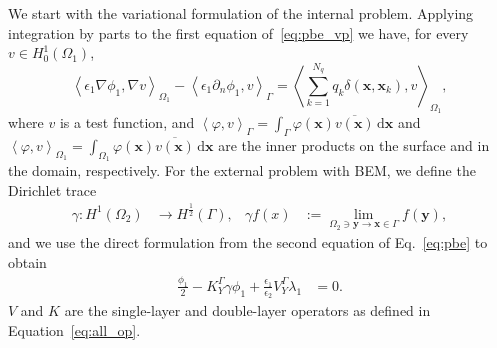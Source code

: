 We start with the variational formulation of the internal problem. Applying integration by parts to the first equation of~\eqref{eq:pbe_vp} we have, for every $v \in H_0^1(\Omega_1)$,
% 
\begin{equation}
\label{eq:fem}
 \left\langle \epsilon_1 \nabla \phi_1, \nabla v \right\rangle_{\Omega_1}  -  \left\langle  \epsilon_1\partial_n \phi_1, v \right\rangle_\Gamma =  \left\langle \sum_{k=1}^{N_q} q_k\delta(\mathbf{x},\mathbf{x}_k),  v\right\rangle_{\Omega_1},
\end{equation}
%
where $v$ is a test function, and $\left\langle\varphi,v\right\rangle_\Gamma = \int_\Gamma \varphi(\mathbf{x})\overline{v(\mathbf{x})}\,\mathrm{d}\mathbf{x}$ and $\left\langle\varphi,v\right\rangle_{\Omega_1} = \int_{\Omega_1} \varphi(\mathbf{x})\overline{v(\mathbf{x})}\,\mathrm{d}\mathbf{x}$ are the inner products on the surface and in the domain, respectively.
For the external problem with BEM, we define the Dirichlet trace~\cite{MR2361676} 
\begin{align*}
\gamma:  H^1(\Omega_2) &\rightarrow H^{\frac{1}{2}}(\Gamma), & \gamma f(x) & := \lim_{\Omega_2 \ni \mathbf{y} \rightarrow \mathbf{x} \in \Gamma}  f(\mathbf{y}),
\end{align*}
and we use the direct formulation from the second equation of Eq.~\eqref{eq:pbe} to obtain
\begin{align*}
\tfrac{\phi_1}{2} - K_{Y}^{\Gamma}\gamma \phi_1 + \tfrac{\epsilon_1}{\epsilon_2}V_{Y}^{\Gamma}  \lambda_1 & = 0.
\end{align*}
$V$ and $K$ are the single-layer and double-layer operators as defined in Equation~\eqref{eq:all_op}.
%
%
%
%

